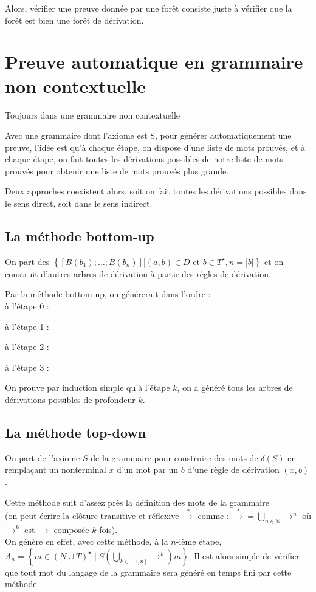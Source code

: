\documentclass[a4paper,10pt]{article}
\begin{document}

Alors, vérifier une preuve donnée par une forêt consiste juste à vérifier que la forêt est bien une forêt de dérivation.

\section{Preuve automatique en grammaire non contextuelle}

Toujours dans une grammaire non contextuelle

Avec une grammaire dont l'axiome est S,
pour générer automatiquement une preuve, l'idée est qu'à chaque étape,
on dispose d'une liste de mots prouvés,
et à chaque étape, on fait toutes les dérivations possibles de notre liste de mots prouvés pour obtenir une liste de mots prouvés plus grande.

Deux approches coexistent alors, soit on fait toutes les dérivations possibles dans le sens direct, soit dans le sens indirect.

\subsection{La méthode bottom-up}

On part des $\left\{ [B(b_1);\dots;B(b_n)] | (a,b)\in D \text{ et } b \in T^\star , n = |b|\right\}$ et on construit d'autres arbres de dérivation à partir des règles de dérivation.

Par la méthode bottom-up, on générerait dans l'ordre :\\
à l'étape 0 :
 
à l'étape 1 : 
 
à l'étape 2 : 
 
à l'étape 3 : 
 

On prouve par induction simple qu'à l'étape $k$, on a généré tous les arbres de dérivations possibles de profondeur $k$.

\subsection{La méthode top-down}

On part de l'axiome $S$ de la grammaire pour construire des mots de $\delta(S)$ en remplaçant un nonterminal $x$ d'un mot par un $b$ d'une règle de dérivation $(x,b)$.

Cette méthode suit d'assez près la définition des mots de la grammaire\\
(on peut écrire la clôture transitive et réflexive $\overset{*}{\rightarrow}$ comme :
$\overset{*}{\rightarrow} = \bigcup_{n \in \mathbb{N}} \rightarrow ^n$ où $\rightarrow^k$ est $\rightarrow$ composée $k$ fois).\\
On génère en effet, avec cette méthode, à la $n$-ième étape, $A_n = \left\{m \in (N \cup T)^\star \mid  S \left(\bigcup_{k \in [1,n]} \rightarrow^k\right) m\right\}$.
Il est alors simple de vérifier que tout mot du langage de la grammaire sera généré en temps fini par cette méthode.
\end{document}
